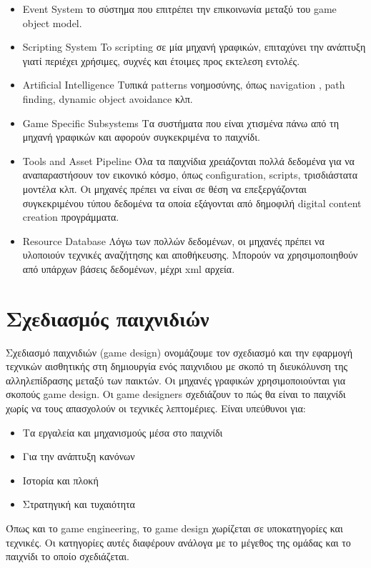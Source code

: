 \begin{itemize}
\item Event System
το σύστημα που επιτρέπει την επικοινωνία μεταξύ του game object model.
\item Scripting System
To scripting σε μία μηχανή γραφικών, επιταχύνει την ανάπτυξη γιατί περιέχει χρήσιμες, συχνές και έτοιμες προς εκτελεση εντολές.
\item Artificial Intelligence
Τυπικά patterns νοημοσύνης, όπως navigation , path finding, dynamic object avoidance κλπ.
\item Game Specific Subsystems
Τα συστήματα που είναι χτισμένα πάνω από τη μηχανή γραφικών και αφορούν συγκεκριμένα το παιχνίδι.
\item Tools and Asset Pipeline
Όλα τα παιχνίδια χρειάζονται πολλά δεδομένα για να αναπαραστήσουν τον εικονικό κόσμο, όπως configuration, scripts, τρισδιάστατα μοντέλα κλπ. Οι μηχανές πρέπει να είναι σε θέση να επεξεργάζονται συγκεκριμένου τύπου δεδομένα τα οποία εξάγονται από δημοφιλή digital content creation προγράμματα.
\item Resource Database
Λόγω των πολλών δεδομένων, οι μηχανές πρέπει να υλοποιούν τεχνικές αναζήτησης και αποθήκευσης. Μπορούν να χρησιμοποιηθούν από υπάρχων βάσεις δεδομένων, μέχρι xml αρχεία. 
\end{itemize}

\section{Σχεδιασμός παιχνιδιών}
Σχεδιασμό παιχνιδιών (game design) ονομάζουμε τον σχεδιασμό και την εφαρμογή τεχνικών αισθητικής στη δημιουργία ενός παιχνιδιου με σκοπό τη διευκόλυνση της αλληλεπίδρασης μεταξύ των παικτών. Οι μηχανές γραφικών χρησιμοποιούνται για σκοπούς game design. Οι game designers σχεδιάζουν το πώς θα είναι το παιχνίδι χωρίς να τους απασχολούν οι τεχνικές λεπτομέριες. Είναι υπεύθυνοι για:
\begin{itemize}
	\item Τα εργαλεία και μηχανισμούς μέσα στο παιχνίδι
	\item Για την ανάπτυξη κανόνων
	\item Ιστορία και πλοκή
	\item Στρατηγική και τυχαιότητα	
\end{itemize}

Όπως και το game engineering, το game design χωρίζεται σε υποκατηγορίες και τεχνικές. Οι κατηγορίες αυτές διαφέρουν ανάλογα με το μέγεθος της ομάδας και το παιχνίδι το οποίο σχεδιάζεται.
